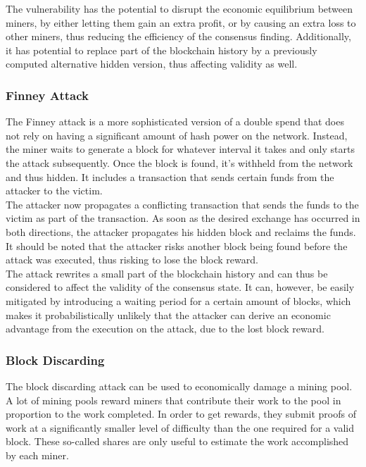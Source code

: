 \documentclass[11pt,a4paper]{article}
\begin{document}
The vulnerability has the potential to disrupt the economic equilibrium between miners, by either letting them gain an extra profit, or by causing an extra loss to other miners, thus reducing the efficiency of the consensus finding. Additionally, it has potential to replace part of the blockchain history by a previously computed alternative hidden version, thus affecting validity as well.\\

\subsubsection{Finney Attack}

The Finney attack is a more sophisticated version of a double spend that does not rely on having a significant amount of hash power on the network. Instead, the miner waits to generate a block for whatever interval it takes and only starts the attack subsequently. Once the block is found, it's withheld from the network and thus hidden. It includes a transaction that sends certain funds from the attacker to the victim.\\

The attacker now propagates a conflicting transaction that sends the funds to the victim as part of the transaction. As soon as the desired exchange has occurred in both directions, the attacker propagates his hidden block and reclaims the funds. It should be noted that the attacker risks another block being found before the attack was executed, thus risking to lose the block reward.\\

The attack rewrites a small part of the blockchain history and can thus be considered to affect the validity of the consensus state. It can, however, be easily mitigated by introducing a waiting period for a certain amount of blocks, which makes it probabilistically unlikely that the attacker can derive an economic advantage from the execution on the attack, due to the lost block reward.\\

\subsubsection{Block Discarding}

The block discarding attack can be used to economically damage a mining pool. A lot of mining pools reward miners that contribute their work to the pool in proportion to the work completed. In order to get rewards, they submit proofs of work at a significantly smaller level of difficulty than the one required for a valid block. These so-called shares are only useful to estimate the work accomplished by each miner.\\
\end{document}

